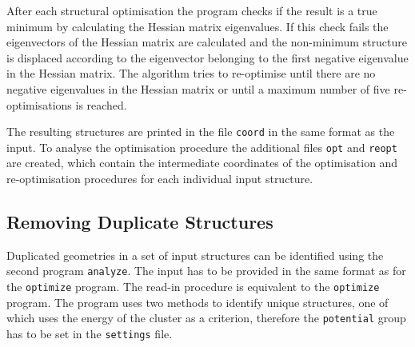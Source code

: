 After each structural optimisation the program checks if the result is a true
minimum by calculating the Hessian matrix eigenvalues. If this check fails the
eigenvectors of the Hessian matrix are calculated and the non-minimum structure
is displaced according to the eigenvector belonging to the first negative
eigenvalue in the Hessian matrix. The algorithm tries to re-optimise until there
are no negative eigenvalues in the Hessian matrix or until a maximum number of
five re-optimisations is reached.

The resulting structures are printed in the file \texttt{coord} in the same
format as the input. To analyse the optimisation procedure the additional files
\texttt{opt} and \texttt{reopt} are created, which contain the intermediate
coordinates of the optimisation and re-optimisation procedures for each individual
input structure.

\subsection{Removing Duplicate Structures}
\label{sec:analysingresults}

Duplicated geometries in a set of input structures can be identified using the
second program \texttt{analyze}. The input has to be provided in the same format
as for the \texttt{optimize} program. The read-in procedure is equivalent to the
\texttt{optimize} program. The program uses two methods to identify unique
structures, one of which uses the energy of the cluster as a criterion,
therefore the \texttt{potential} group has to be set in the \texttt{settings}
file.

